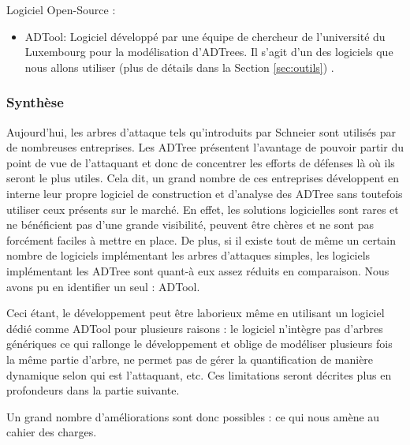         Logiciel Open-Source :
        \begin{itemize}
        	\item ADTool: Logiciel développé par une équipe de chercheur de l'université du Luxembourg pour la modélisation d'ADTrees. Il s'agit d'un des logiciels que nous allons utiliser (plus de détails dans la Section \ref{sec:outils}) \cite{ADTool}.
        \end{itemize}

        \subsubsection{Synthèse}
            Aujourd'hui, les arbres d'attaque tels qu'introduits par Schneier sont utilisés par de nombreuses entreprises. Les ADTree présentent l'avantage de pouvoir partir du point de vue de l'attaquant et donc de concentrer les efforts de défenses là où ils seront le plus utiles. Cela dit, un grand nombre de ces entreprises développent en interne leur propre logiciel de construction et d'analyse des ADTree sans toutefois utiliser ceux présents sur le marché. En effet, les solutions logicielles sont rares et ne bénéficient pas d'une grande visibilité, peuvent être chères et ne sont pas forcément faciles à mettre en place. De plus, si il existe tout de même un certain nombre de logiciels implémentant les arbres d'attaques simples, les logiciels implémentant les ADTree sont quant-à eux assez réduits en comparaison. Nous avons pu en identifier un seul : ADTool. 

            Ceci étant, le développement peut être laborieux même en utilisant un logiciel dédié comme ADTool pour plusieurs raisons : le logiciel n’intègre pas d'arbres génériques ce qui rallonge le développement et oblige de modéliser plusieurs fois la même partie d'arbre, ne permet pas de gérer la quantification de manière dynamique selon qui est l'attaquant, etc. Ces limitations seront décrites plus en profondeurs dans la partie suivante.

            Un grand nombre d'améliorations sont donc possibles : ce qui nous amène au cahier des charges.
